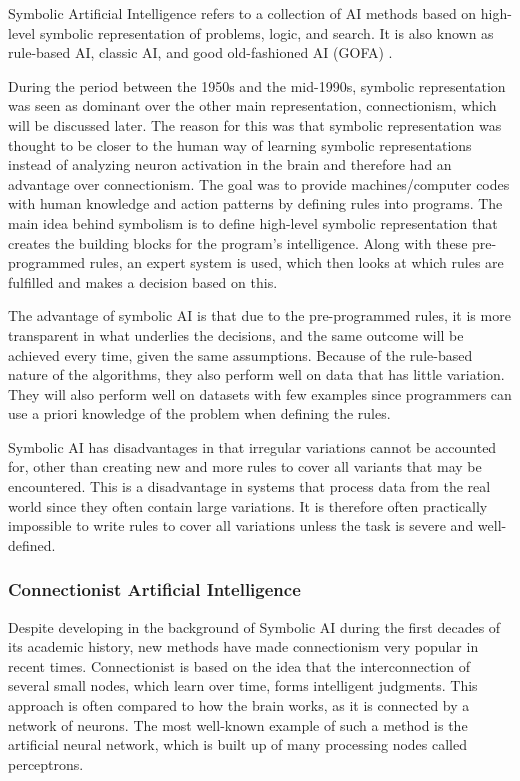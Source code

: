 Symbolic Artificial Intelligence refers to a collection of AI methods based on high-level symbolic representation of problems, logic, and search. It is also known as rule-based AI, classic AI, and good old-fashioned AI (GOFA) \cite{haugelandArtificialIntelligenceVery1989}. 

During the period between the 1950s and the mid-1990s, symbolic representation was seen as dominant over the other main representation, connectionism, which will be discussed later. The reason for this was that symbolic representation was thought to be closer to the human way of learning symbolic representations instead of analyzing neuron activation in the brain and therefore had an advantage over connectionism.
The goal was to provide machines/computer codes with human knowledge and action patterns by defining rules into programs. The main idea behind symbolism is to define high-level symbolic representation that creates the building blocks for the program's intelligence. Along with these pre-programmed rules, an expert system is used, which then looks at which rules are fulfilled and makes a decision based on this.

The advantage of symbolic AI is that due to the pre-programmed rules, it is more transparent in what underlies the decisions, and the same outcome will be achieved every time, given the same assumptions. Because of the rule-based nature of the algorithms, they also perform well on data that has little variation. They will also perform well on datasets with few examples since programmers can use a priori knowledge of the problem when defining the rules.

Symbolic AI has disadvantages in that irregular variations cannot be accounted for, other than creating new and more rules to cover all variants that may be encountered. This is a disadvantage in systems that process data from the real world since they often contain large variations. It is therefore often practically impossible to write rules to cover all variations unless the task is severe and well-defined.


\subsubsection{Connectionist Artificial Intelligence}
Despite developing in the background of Symbolic AI during the first decades of its academic history, new methods have made connectionism very popular in recent times.  Connectionist is based on the idea that the interconnection of several small nodes, which learn over time, forms intelligent judgments. This approach is often compared to how the brain works, as it is connected by a network of neurons. The most well-known example of such a method is the artificial neural network, which is built up of many processing nodes called perceptrons.

